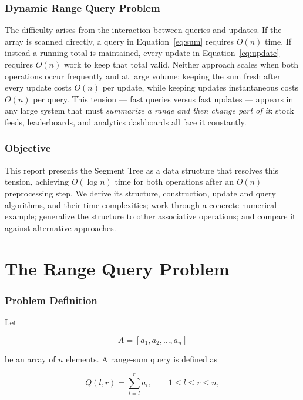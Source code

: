 \documentclass[11pt,open=any,headings=option]{scrreprt}
\begin{document}
\subsection{Dynamic Range Query Problem}
The difficulty arises from the interaction between queries and updates. If the array is scanned directly, a query in Equation~\eqref{eq:sum} requires $O(n)$ time. If instead a running total is maintained, every update in Equation~\eqref{eq:update} requires $O(n)$ work to keep that total valid. Neither approach scales when both operations occur frequently and at large volume: keeping the sum fresh after every update costs $O(n)$ per update, while keeping updates instantaneous costs $O(n)$ per query. This tension --- fast queries versus fast updates --- appears in any large system that must \emph{summarize a range and then change part of it}: stock feeds, leaderboards, and analytics dashboards all face it constantly.

\subsection{Objective}
This report presents the Segment Tree as a data structure that resolves this tension, achieving $O(\log n)$ time for both operations after an $O(n)$ preprocessing step. We derive its structure, construction, update and query algorithms, and their time complexities; work through a concrete numerical example; generalize the structure to other associative operations; and compare it against alternative approaches.

\chapter{The Range Query Problem}

\subsection{Problem Definition}
Let

\begin{equation}
A = [a_1, a_2, \ldots, a_n]
\end{equation}

be an array of $n$ elements. A range-sum query is defined as

\begin{equation}
Q(l,r) = \sum_{i=l}^{r} a_i, \qquad 1 \le l \le r \le n,
\end{equation}
\end{document}
